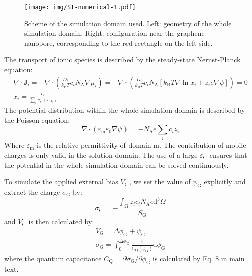 \documentclass[manuscript=suppinfo,email=true, hyperref=true, keywords=false]{achemso}
\begin{document}
\begin{figure}[htbp]
  \centering
  \texttt{[image: img/SI-numerical-1.pdf]}
  \caption{Scheme of the simulation domain used. Left: geometry of the
    whole simulation domain. Right: configuration near the graphene
    nanopore, corresponding to the red rectangle on the left side.}
  \label{fig:scheme}
\end{figure}

The transport of ionic species is described by the steady-state
Nernst-Planck equation:
\begin{eqnarray}
  \label{eq:pnp}
  \nabla \cdot \boldsymbol{J}_{i} = -\nabla \cdot \left( \frac{D_{i}}{k_{\mathrm{B}}T} c_{i} N_{\mathrm{A}} \nabla \mu_{i}\right)
  = -\nabla \cdot \left( \frac{D_{i}}{k_{\mathrm{B}} T} c_{i} N_{\mathrm{A}}
  [k_{\mathrm{B}}T \nabla \ln x_{i} + z_{i} e \nabla \psi]\right) = 0\\
  x_{i} = \frac{c_{i}}{\sum_{i} c_{i} + c_{\mathrm{H_{2}O}}}
\end{eqnarray}
The potential distribution within the whole simulation domain is
described by the Poisson equation:
\begin{equation}
  \label{eq:poisson}
  \nabla \cdot (\varepsilon_{\mathrm{m}} \varepsilon_{0} \nabla \psi) = -N_{\mathrm{A}} e \sum_{i} c_{i}z_{i}
\end{equation}
Where $\varepsilon_{\mathrm{m}}$ is the relative permittivity of
domain m. The contribution of mobile charges is only valid in the
solution domain. The use of a large $\varepsilon_{\mathrm{G}}$ ensures
that the potential in the whole simulation domain can be solved
continuously. 

To simulate the applied external bias $V_{\mathrm{G}}$, we set the
value of $\psi_{\mathrm{G}}$ explicitly and extract the charge
$\sigma_{\mathrm{G}}$ by:
\begin{equation}
  \label{eq:sigma-G}
  \sigma_{\mathrm{G}} = - {\displaystyle \frac{\int_{\mathrm{\Omega}} z_{i} c_{i} N_{\mathrm{A}} e \mathrm{d}^{3} \Omega}{S_{\mathrm{G}}}}
\end{equation}
and $V_{\mathrm{G}}$ is then calculated by:
\begin{eqnarray}
  \label{eq:VG}
  V_{\mathrm{G}} = \Delta \phi_{\mathrm{G}} + \psi_{\mathrm{G}}\\
  \sigma_{\mathrm{G}} = \int_{0}^{\Delta \phi_{\mathrm{G}}} \frac{1}{C_{\mathrm{Q}}(\phi_{\mathrm{G}})} \mathrm{d} \phi_{\mathrm{G}}
\end{eqnarray}
where the quantum capacitance
$C_{\mathrm{Q}}=\partial \sigma_{\mathrm{G}}/\partial
\phi_{\mathrm{G}}$ is calculated by Eq. 8 in main text.
\end{document}
